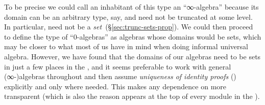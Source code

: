 To be precise we could call an inhabitant of this type an ``∞-algebra'' because its domain can be an arbitrary type, say,  and need not be truncated at some level. In particular,  need not be a \emph{set}~(\S\ref{sec:trunc-sets-prop}). We could then proceed to define the type of ``0-algebras'' as algebras whose domains would be sets, which may be closer to what most of us have in mind when doing informal universal algebra. However, we have found that the domains of our algebras need to be sets in just a few places in the \ualib, and it seems preferable to work with general (∞-)algebras throughout and then assume \emph{uniqueness of identity proofs} (\uip) explicitly and only where needed.  This makes any dependence on \uip more transparent (which is also the reason  appears at the top of every module in the \ualib).


